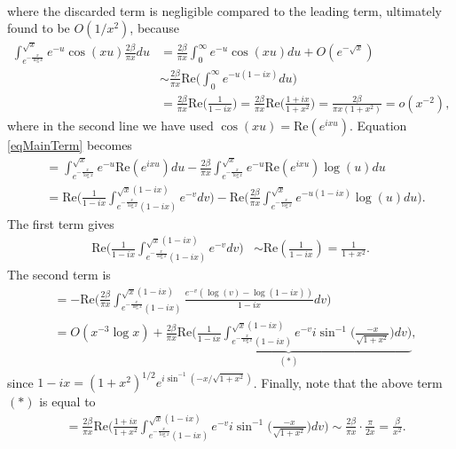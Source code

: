 \documentclass[11pt]{article}
\theoremstyle{definition}
\begin{document}
\begin{appendix}
\begin{align}
	\end{align}
    where the discarded term is negligible compared to the leading term, ultimately found to be $O(1/x^2)$, because
    \begin{align*}
        \int_{e^{-\frac{x}{\log x}}}^{\sqrt{x}}e^{-u}\cos(xu)\frac{2\beta}{\pi x} du &= \frac{2\beta}{\pi x} \int_{0}^{\infty}e^{-u}\cos(xu) du + O(e^{-\sqrt{x}}) \\
        &\sim \frac{2\beta}{\pi x} \text{Re}\Big( \int_0^\infty e^{-u(1-ix)} du \Big) \\
        &= \frac{2\beta}{\pi x} \text{Re}\Big( \frac{1}{1-ix} \Big) = \frac{2\beta}{\pi x} \text{Re}\Big( \frac{1+ix}{1+x^2} \Big) = \frac{2\beta}{\pi x(1+x^2)} = o(x^{-2}),
    \end{align*}
    where in the second line we have used $\cos(xu) = \text{Re}(e^{ixu})$. Equation \eqref{eqMainTerm} becomes
	\begin{align*}
	&= \int_{e^{-\frac{x}{\log x}}}^{\sqrt{x}} e^{-u} \text{Re}(e^{ix u}) du-\frac{2\beta }{\pi x} \int_{e^{-\frac{x}{\log x}}}^{\sqrt{x}} e^{-u} \text{Re}(e^{ixu}) \log (u) du \\
	&= \text{Re}\bigg(\frac{1}{1-ix}\int_{e^{-\frac{x}{\log x}}(1-ix)}^{\sqrt{x}(1-ix)} e^{-v} dv\bigg) -\text{Re}\bigg(\frac{2\beta }{\pi x} \int_{e^{-\frac{x}{\log x}}}^{\sqrt{x}} e^{-u(1-ix)} \log (u) du\bigg).
	\end{align*}
	The first term gives
	\begin{align*}
	\text{Re}\bigg(\frac{1}{1-ix}\int_{e^{-\frac{x}{\log x}}(1-ix)}^{\sqrt{x}(1-ix)} e^{-v} dv\bigg) &\sim \text{Re}\left(\frac{1}{1-ix} \right) = \frac{1}{1+x^2}.
	\end{align*}
	The second term is
	\begin{align*}
	&= -\text{Re}\bigg(\frac{2\beta }{\pi x} \int_{e^{-\frac{x}{\log x}}(1-ix)}^{\sqrt{x}(1-ix)} \frac{e^{-v} (\log (v) - \log(1-ix))}{1-ix} dv \bigg)\\
	&= O(x^{-3}\log x) + \underbrace{ \frac{2\beta}{\pi x}\text{Re}\bigg( \frac{1}{1-ix}\int_{e^{-\frac{x}{\log x}}(1-ix)}^{\sqrt{x}(1-ix)} e^{-v}i\sin^{-1}\bigg(\frac{-x}{\sqrt{1+x^2}} \bigg) dv\bigg)}_{(*)},
	\end{align*}
	since $1-ix = (1+x^2)^{1/2}e^{i \sin^{-1}(-x/\sqrt{1+x^2})}$. Finally, note that the above term $(*)$ is equal to
	\begin{align*}
	&= \frac{2\beta}{\pi x}\text{Re}\bigg( \frac{1+ix}{1+x^2}\int_{e^{-\frac{x}{\log x}}(1-ix)}^{\sqrt{x}(1-ix)} e^{-v} i\sin^{-1}\bigg(\frac{-x}{\sqrt{1+x^2}} \bigg) dv\bigg) \sim \frac{2\beta}{\pi x} \cdot \frac{\pi}{2x} = \frac{\beta}{x^2}.

\end{align*}
\end{appendix}
\end{document}
